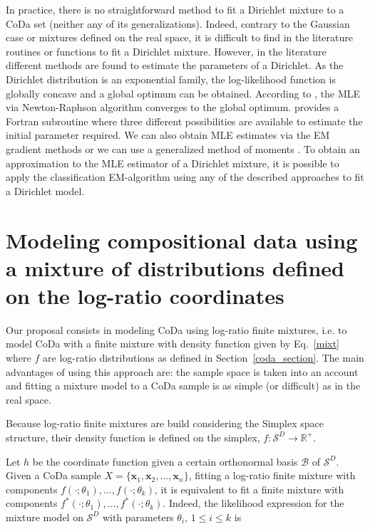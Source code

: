 \documentclass[10pt, a4paper]{article}
\begin{document}
In practice, there is no straightforward method to fit a Dirichlet mixture to a CoDa set (neither any of its generalizations). Indeed, contrary to the Gaussian case or mixtures defined on the real space, it is difficult to find in the literature routines or functions to fit a Dirichlet mixture. However, in the literature different methods are found to estimate the parameters of a Dirichlet. As the Dirichlet distribution is an exponential family, the log-likelihood function is globally concave and a global optimum can be obtained. According to \cite{ng2011dirichlet}, the MLE via Newton-Raphson algorithm converges to the global optimum. \cite{narayanan1991algorithm} provides a Fortran subroutine where three different possibilities are available to estimate the initial parameter required.
We can also obtain MLE estimates via the EM gradient methods \citep{ng2011dirichlet} or we can use a generalized method of moments
\citep{hansen1982large}.  
To obtain an approximation to the MLE estimator of a Dirichlet mixture, it is possible to apply the classification EM-algorithm \citep[CEM algorithm,][]{celeux1992classification} using any of the described approaches to fit a Dirichlet model.



\section{Modeling compositional data using a mixture of distributions defined on the log-ratio coordinates}
\label{codamix_section}


\noindent Our proposal consists in modeling  CoDa using log-ratio finite mixtures, i.e. to model CoDa with a finite mixture with density function given by Eq.~\ref{mixt} where $f$ are log-ratio distributions as defined in Section~\ref{coda_section}.
The main advantages of using this approach are: the sample space is taken into an account and fitting a mixture model to a CoDa sample  is as simple (or difficult) as in the real space.

Because log-ratio finite mixtures are build considering the Simplex space structure, their density function is defined on the simplex, $f:\mathcal{S}^D\rightarrow \mathbb{R}^+$. 

Let $h$ be the coordinate function given a certain orthonormal basis $\mathcal{B}$ of $\mathcal{S}^D$. Given a CoDa sample $X =  \{ \textbf{x}_1, \textbf{x}_2, \dots , \textbf{x}_n \}$, fitting a log-ratio finite mixture with components $f(\cdot; \theta_1), \dots, f(\cdot;\theta_k)$, it is equivalent to fit a finite mixture with components $f^*(\cdot; \theta_1), \dots, f^*(\cdot;\theta_k)$. Indeed, the likelihood expression for the mixture model on $\mathcal{S}^D$ with parameters $ \theta_i $, $1\leq i \leq k$  is
\end{document}
